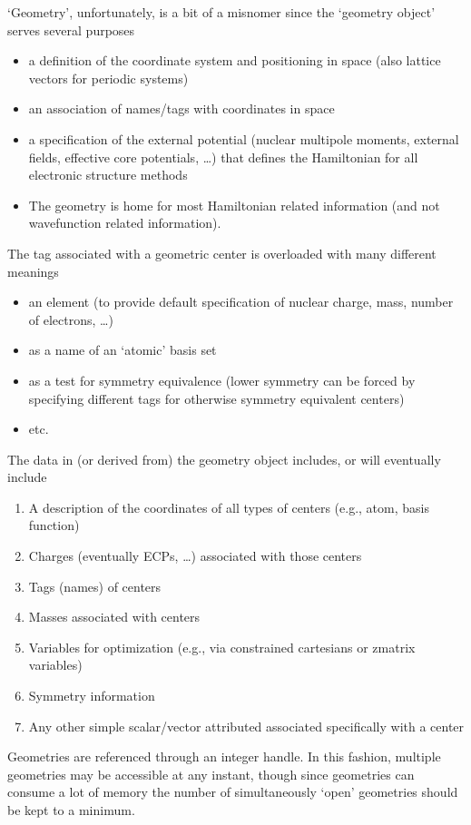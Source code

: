   `Geometry', unfortunately, is a bit of a misnomer since the
`geometry object' serves several purposes
\begin{itemize}
\item a definition of the coordinate system and positioning in space
  (also lattice vectors for periodic systems)
\item an association of names/tags with coordinates in space
\item a specification of the external potential (nuclear multipole
  moments, external fields, effective core potentials, \ldots) that
  defines the Hamiltonian for all electronic structure methods
\item The geometry is home for most Hamiltonian related information (and
  not wavefunction related information).
\end{itemize}

The tag associated with a geometric center is overloaded with many
different meanings
\begin{itemize}
\item an element (to provide default specification of nuclear charge,
  mass, number of electrons, \ldots)
\item as a name of an `atomic' basis set
\item as a test for symmetry equivalence (lower symmetry can be forced
     by specifying different tags for otherwise symmetry equivalent
     centers)
\item etc.
\end{itemize}

The data in (or derived from) the geometry object includes, or will
eventually include
\begin{enumerate}
\item A description of the coordinates of all types of centers (e.g.,
      atom, basis function)
\item Charges (eventually ECPs, \ldots) associated with those centers
\item Tags (names) of centers
\item Masses associated with centers
\item Variables for optimization (e.g., via constrained cartesians
      or zmatrix variables)
\item Symmetry information
\item Any other simple scalar/vector attributed associated
      specifically with a center
\end{enumerate}

Geometries are referenced through an integer handle.  In this fashion,
multiple geometries may be accessible at any instant, though since
geometries can consume a lot of memory the number of simultaneously
`open' geometries should be kept to a minimum.


